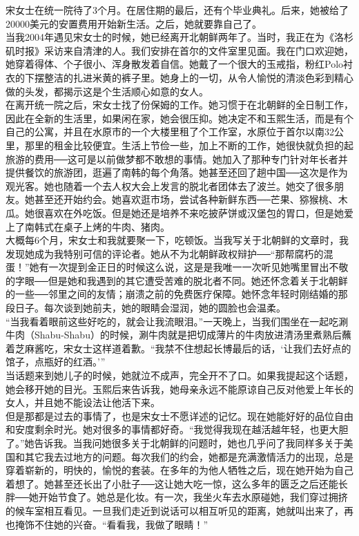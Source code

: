 宋女士在统一院待了3个月。在居住期的最后，还有个毕业典礼。后来，她被给了20000美元的安置费用开始新生活。之后，她就要靠自己了。\\

当我2004年遇见宋女士的时候，她已经离开北朝鲜两年了。当时，我正在为《洛杉矶时报》采访来自清津的人。我们安排在首尔的文件室里见面。我在门口欢迎她，她穿着得体、个子很小、浑身散发着自信。她戴了一个很大的玉戒指，粉红Polo衬衣的下摆整洁的扎进米黄的裤子里。她身上的一切，从令人愉悦的清淡色彩到精心做的头发，都揭示这是个生活顺心如意的女人。\\

在离开统一院之后，宋女士找了份保姆的工作。她习惯于在北朝鲜的全日制工作，因此在全新的生活里，如果闲在家，她会很压抑。她决定不和玉熙生活，而是有个自己的公寓，并且在水原市的一个大楼里租了个工作室，水原位于首尔以南32公里，那里的租金比较便宜。生活上节俭一些，加上不断的工作，她很快就负担的起旅游的费用──这可是以前做梦都不敢想的事情。她加入了那种专门针对年长者并提供餐饮的旅游团，逛遍了南韩的每个角落。她甚至还回了趟中国──这次是作为观光客。她也随着一个去人权大会上发言的脱北者团体去了波兰。她交了很多朋友。她甚至还开始约会。她喜欢逛市场，尝试各种新鲜东西──芒果、猕猴桃、木瓜。她很喜欢在外吃饭。但是她还是培养不来吃披萨饼或汉堡包的胃口，但是她爱上了南韩式在桌子上烤的牛肉、猪肉。\\

大概每6个月，宋女士和我就要聚一下，吃顿饭。当我写关于北朝鲜的文章时，我发现她成为我特别可信的评论者。她从不为北朝鲜政权辩护──“那帮腐朽的混蛋！”她有一次提到金正日的时候这么说，这是是我唯一一次听见她嘴里冒出不敬的字眼──但是她和我遇到的其它遭受苦难的脱北者不同。她还怀念着关于北朝鲜的一些──邻里之间的友情；崩溃之前的免费医疗保障。她怀念年轻时刚结婚的那段日子。每次谈到她前夫，她的眼睛会湿润，她的圆脸也会温柔。\\

“当我看着眼前这些好吃的，就会让我流眼泪。”一天晚上，当我们围坐在一起吃涮牛肉（Shabu-Shabu）的时候，涮牛肉就是把切成薄片的牛肉放进清汤里煮熟后蘸着芝麻酱吃，宋女士这样道着歉。“我禁不住想起长博最后的话，‘让我们去好点的馆子，点瓶好的红酒。’”\\

当话题来到她儿子的时候，她就泣不成声，完全开不了口。如果我提起这个话题，她会移开她的目光。玉熙后来告诉我，她母亲永远不能原谅自己反对他爱上年长的女人，并且她不能设法让他活下来。\\

但是那都是过去的事情了，也是宋女士不愿详述的记忆。现在她能好好的品位自由和安度剩余时光。她对很多的事情都好奇。“我觉得我现在越活越年轻，也更大胆了。”她告诉我。当我问她很多关于北朝鲜的问题时，她也几乎问了我同样多关于美国和其它我去过地方的问题。每次我们的约会，她都是充满激情活力的出现，总是穿着崭新的，明快的，愉悦的套装。在多年的为他人牺牲之后，现在她开始为自己着想了。她甚至还长出了小肚子──这让她大吃一惊，这么多年的匮乏之后还能长胖──她开始节食了。她总是化妆。有一次，我坐火车去水原碰她，我们穿过拥挤的候车室相互看见。一旦我们走近到说话可以相互听见的距离，她就叫出来了，再也掩饰不住她的兴奋。“看看我，我做了眼睛！”\\

